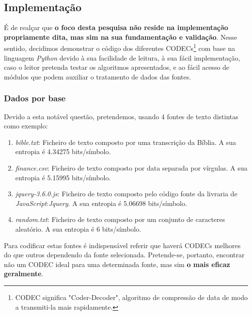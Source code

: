 \documentclass[11pt,journal,compsoc]{IEEEtran}
\begin{document}
\subsection{Implementação}


É de realçar que \textbf{o foco desta pesquisa não reside na implementação propriamente dita, mas sim na sua fundamentação e validação}. Nesse sentido, decidimos demonstrar o código dos diferentes CODECs\footnote{CODEC significa "Coder-Decoder", algoritmo de compressão de data de modo a transmiti-la mais rapidamente.} com base na linguagem \textit{Python} devido à sua facilidade de leitura, à sua fácil implementação, caso o leitor pretenda testar os algoritmos apresentados, e ao fácil acesso de módulos que podem auxiliar o tratamento de dados das fontes.

\IEEEpubidadjcol

\subsubsection{Dados por base}
Devido a esta notável questão, pretendemos, usando 4 fontes de texto distintas como exemplo:
\begin{enumerate}
    \item \textit{bible.txt}: Ficheiro de texto composto por uma transcrição da Bíblia. A sua entropia é 4.34275 bits/símbolo.
    \item \textit{finance.csv}: Ficheiro de texto composto por data separada por vírgulas. A sua entropia é 5.15995 bits/símbolo.
    \item \textit{jquery-3.6.0.js}: Ficheiro de texto composto pelo código fonte da livraria de \textit{JavaScript}:\textit{Jquery}. A sua entropia é 5.06698 bits/símbolo.
    \item \textit{random.txt}: Ficheiro de texto composto por um conjunto de caracteres aleatório. A sua entropia é 6 bits/símbolo.
\end{enumerate}

Para codificar estas fontes é indispensável referir que haverá CODECs melhores do que outros dependendo da fonte selecionada. Pretende-se, portanto, encontrar não um CODEC ideal para uma determinada fonte, mas sim \textbf{o mais eficaz geralmente}. 
\end{document}
